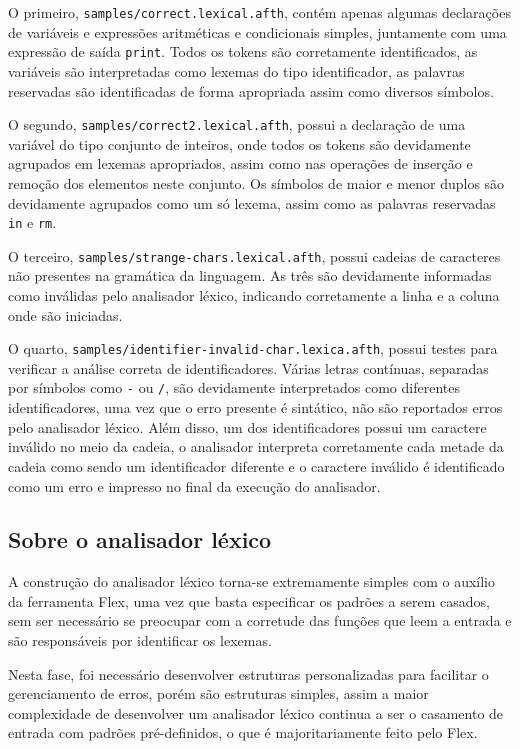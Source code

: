 \documentclass[
	article,			%
	11pt,				%
	oneside,			%
	a4paper,			%
	english,			%
	brazil,				%
	sumario=tradicional
	]{abntex2}
\begin{document}
O primeiro, \texttt{samples/correct.lexical.afth}, contém apenas
algumas declarações de variáveis e expressões aritméticas e condicionais
simples, juntamente com uma expressão de saída \texttt{print}.
Todos os tokens são corretamente identificados, as variáveis são
interpretadas como lexemas do tipo identificador, as palavras reservadas
são identificadas de forma apropriada assim como diversos símbolos.

O segundo, \texttt{samples/correct2.lexical.afth}, possui a declaração
de uma variável do tipo conjunto de inteiros, onde todos os tokens são
devidamente agrupados em lexemas apropriados, assim como nas operações
de inserção e remoção dos elementos neste conjunto. Os símbolos de
maior e menor duplos são devidamente agrupados como um só lexema, assim
como as palavras reservadas \texttt{in} e \texttt{rm}.

O terceiro, \texttt{samples/strange-chars.lexical.afth}, possui
cadeias de caracteres não presentes na gramática da linguagem. As três
são devidamente informadas como inválidas pelo analisador léxico,
indicando corretamente a linha e a coluna onde são iniciadas.

O quarto, \texttt{samples/identifier-invalid-char.lexica.afth}, possui
testes para verificar a análise correta de identificadores. Várias letras
contínuas, separadas por símbolos como \texttt{-} ou \texttt{/}, são
devidamente interpretados como diferentes identificadores, uma vez que
o erro presente é sintático, não são reportados erros pelo analisador léxico.
Além disso, um dos identificadores possui um caractere inválido no
meio da cadeia, o analisador interpreta corretamente cada metade da cadeia
como sendo um identificador diferente e o caractere inválido é identificado
como um erro e impresso no final da execução do analisador.

\subsection{Sobre o analisador léxico}

A construção do analisador léxico torna-se extremamente simples com
o auxílio da ferramenta Flex, uma vez que basta especificar os padrões
a serem casados, sem ser necessário se preocupar com a corretude
das funções que leem a entrada e são responsáveis por identificar
os lexemas.

Nesta fase, foi necessário desenvolver estruturas personalizadas
para facilitar o gerenciamento de erros, porém são estruturas simples,
assim a maior complexidade de desenvolver um analisador léxico
continua a ser o casamento de entrada com padrões pré-definidos, o que
é majoritariamente feito pelo Flex.
\end{document}
